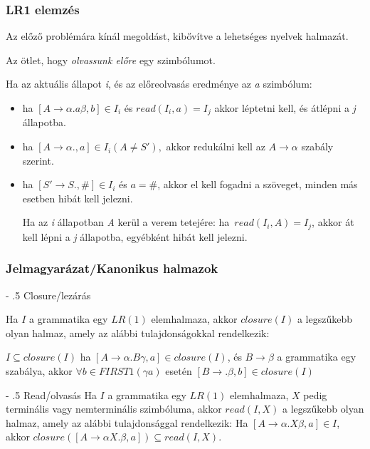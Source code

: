 \documentclass[12pt,margin=0px]{article}
\makeatletter
\renewcommand\paragraph{%
	\@startsection{paragraph}{4}{0mm}%
	{-\baselineskip}%
	{.5\baselineskip}%
	{\normalfont\normalsize\bfseries}}
\makeatother
\begin{document}
    \subsubsection*{LR1 elemzés}
	
	\noindent Az előző problémára kínál megoldást, kibővítve a lehetséges nyelvek halmazát.
	
	\noindent Az ötlet, hogy \emph{olvassunk előre} egy szimbólumot.
	
	\noindent Ha az aktuális állapot \emph{i}, és az előreolvasás eredménye az \emph{a} szimbólum:
	\begin{itemize}
	\item ha $ [A	\rightarrow \alpha.a\beta, b] \in I_i $ és $read(I_i, a) = I_j$
	akkor léptetni kell, és átlépni a \emph{j} állapotba.
	
	\item ha $ [A	\rightarrow \alpha., a] \in I_i (A \neq S'), $
	akkor redukálni kell az $ A \rightarrow \alpha $ szabály szerint.
	
	\item ha $ [S' \rightarrow S., \#] \in I_i $ és $ a = \# $, akkor el kell fogadni a szöveget,	minden más esetben hibát kell jelezni.
	
	Ha az \emph{i} állapotban \emph{A} kerül a verem tetejére:		
    ha\ $read(I_i,A) =	I_j$, akkor át kell lépni a \emph{j} állapotba,	egyébként hibát kell jelezni.
    \end{itemize}
	
\subsubsection*{Jelmagyarázat/Kanonikus halmazok}
	
	\paragraph{Closure/lezárás}
	
	\noindent Ha $ I $ a grammatika egy $ LR(1) $ elemhalmaza, akkor $ closure(I) $ a	legszűkebb olyan halmaz, amely az alábbi tulajdonságokkal rendelkezik:
	
	$I \subseteq closure(I) $ ha $ [A \rightarrow \alpha.B\gamma,a] \in closure(I)$,
	és $ B \rightarrow \beta $ a grammatika egy szabálya, akkor $ \forall b \in FIRST1(\gamma{}a) $ esetén $ [B \rightarrow .\beta,b] \in closure(I) $
	
	\paragraph{Read/olvasás}
	Ha $ I $ a grammatika egy $ LR(1) $ elemhalmaza, $ X $ pedig terminális	vagy nemterminális szimbóluma, akkor $ read(I, X) $ a legszűkebb olyan halmaz, amely az alábbi tulajdonsággal rendelkezik:
	Ha $ [A \rightarrow \alpha. X\beta,a] \in I $, akkor $ closure([ A \rightarrow \alpha X.\beta,a]) \subseteq read(I, X) $.
	
\end{document}
